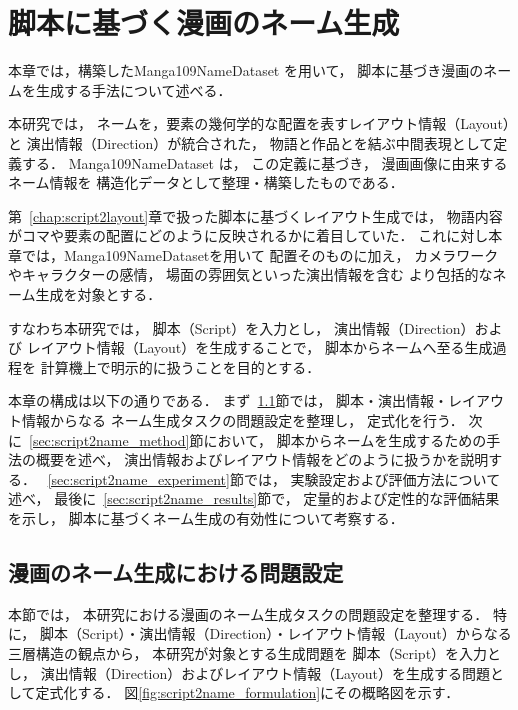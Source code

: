 \documentclass[a4j,12pt,dvipdfmx]{jsreport}
\begin{document}
\ifdefined\ismain\else
   \pagestyle{fancy}
   \lhead{\rightmark}
   \renewcommand{\chaptermark}[1]{\markboth{第\ \thechapter\ 章\ #1}{}}
   \setlength{\headheight}{16.5pt}
   \titleformat{\chapter}[hang]{\LARGE\bfseries}{\prechaptername\thechapter\postchaptername}{1em}{}
\fi
\chapter{脚本に基づく漫画のネーム生成}
\label{chap:script2name}
本章では，構築したManga109NameDataset を用いて，
脚本に基づき漫画のネームを生成する手法について述べる．

本研究では，
ネームを，要素の幾何学的な配置を表すレイアウト情報（Layout）と
演出情報（Direction）が統合された，
物語と作品とを結ぶ中間表現として定義する．
Manga109NameDataset は，
この定義に基づき，
漫画画像に由来するネーム情報を
構造化データとして整理・構築したものである．

第~\ref{chap:script2layout}章で扱った脚本に基づくレイアウト生成では，
物語内容がコマや要素の配置にどのように反映されるかに着目していた．
これに対し本章では，Manga109NameDatasetを用いて
配置そのものに加え，
カメラワークやキャラクターの感情，
場面の雰囲気といった演出情報を含む
より包括的なネーム生成を対象とする．

すなわち本研究では，
脚本（Script）を入力とし，
演出情報（Direction）および
レイアウト情報（Layout）を生成することで，
脚本からネームへ至る生成過程を
計算機上で明示的に扱うことを目的とする．

本章の構成は以下の通りである．
まず~\ref{sec:script2name_formulation}節では，
脚本・演出情報・レイアウト情報からなる
ネーム生成タスクの問題設定を整理し，
定式化を行う．
次に~\ref{sec:script2name_method}節において，
脚本からネームを生成するための手法の概要を述べ，
演出情報およびレイアウト情報をどのように扱うかを説明する．
~\ref{sec:script2name_experiment}節では，
実験設定および評価方法について述べ，
最後に~\ref{sec:script2name_results}節で，
定量的および定性的な評価結果を示し，
脚本に基づくネーム生成の有効性について考察する．

\section{漫画のネーム生成における問題設定}
\label{sec:script2name_formulation}
本節では，
本研究における漫画のネーム生成タスクの問題設定を整理する．
特に，
脚本（Script）・演出情報（Direction）・レイアウト情報（Layout）からなる
三層構造の観点から，
本研究が対象とする生成問題を
脚本（Script）を入力とし，
演出情報（Direction）およびレイアウト情報（Layout）を生成する問題として定式化する． 図\ref{fig:script2name_formulation}にその概略図を示す．
\end{document}
